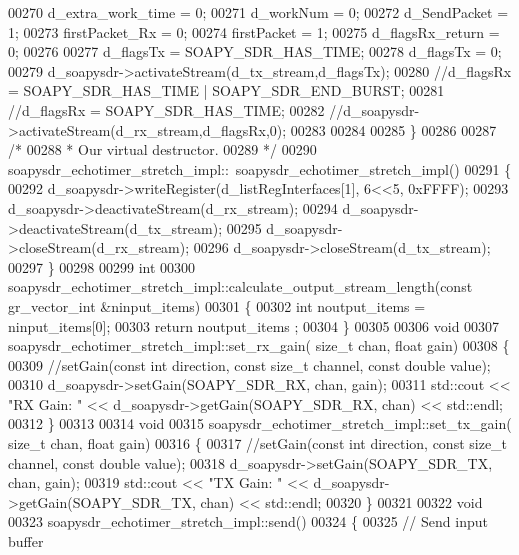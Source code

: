 \begin{DoxyCode}
00270       d_extra_work_time = 0;
00271       d_workNum = 0;
00272       d_SendPacket = 1;
00273       firstPacket_Rx = 0;
00274       firstPacket = 1;
00275       d_flagsRx_return = 0;
00276 
00277       d_flagsTx = SOAPY_SDR_HAS_TIME;
00278       d_flagsTx = 0;
00279       d_soapysdr->activateStream(d_tx_stream,d_flagsTx);
00280       \textcolor{comment}{//d\_flagsRx = SOAPY\_SDR\_HAS\_TIME | SOAPY\_SDR\_END\_BURST;}
00281       \textcolor{comment}{//d\_flagsRx = SOAPY\_SDR\_HAS\_TIME;}
00282       \textcolor{comment}{//d\_soapysdr->activateStream(d\_rx\_stream,d\_flagsRx,0);}
00283 
00284 
00285     \}
00286 
00287     \textcolor{comment}{/*}
00288 \textcolor{comment}{     * Our virtual destructor.}
00289 \textcolor{comment}{     */}
00290     soapysdr_echotimer_stretch_impl::~soapysdr_echotimer_stretch_impl()
00291     \{
00292       d_soapysdr->writeRegister(d_listRegInterfaces[1], 6<<5, 0xFFFF);
00293       d_soapysdr->deactivateStream(d_rx_stream);
00294       d_soapysdr->deactivateStream(d_tx_stream);
00295       d_soapysdr->closeStream(d_rx_stream);
00296       d_soapysdr->closeStream(d_tx_stream);
00297     \}
00298 
00299     \textcolor{keywordtype}{int}
00300     soapysdr_echotimer_stretch_impl::calculate_output_stream_length(\textcolor{keyword}{const} gr\_vector\_int &ninput\_items)
00301     \{
00302       \textcolor{keywordtype}{int} noutput\_items = ninput\_items[0];
00303       \textcolor{keywordflow}{return} noutput\_items ;
00304     \}
00305 
00306     \textcolor{keywordtype}{void}
00307     soapysdr_echotimer_stretch_impl::set_rx_gain( \textcolor{keywordtype}{size\_t} chan, \textcolor{keywordtype}{float} gain)
00308     \{
00309       \textcolor{comment}{//setGain(const int direction, const size\_t channel, const double value);}
00310       d_soapysdr->setGain(SOAPY_SDR_RX, chan, gain);
00311       std::cout << \textcolor{stringliteral}{"RX Gain: "}  << d_soapysdr->getGain(SOAPY_SDR_RX, chan) << std::endl;
00312     \}
00313 
00314     \textcolor{keywordtype}{void}
00315     soapysdr_echotimer_stretch_impl::set_tx_gain( \textcolor{keywordtype}{size\_t} chan, \textcolor{keywordtype}{float} gain)
00316     \{
00317       \textcolor{comment}{//setGain(const int direction, const size\_t channel, const double value);}
00318       d_soapysdr->setGain(SOAPY_SDR_TX, chan, gain);
00319       std::cout << \textcolor{stringliteral}{"TX Gain: "}  << d_soapysdr->getGain(SOAPY_SDR_TX, chan) << std::endl;
00320     \}
00321 
00322     \textcolor{keywordtype}{void}
00323     soapysdr_echotimer_stretch_impl::send()
00324     \{
00325       \textcolor{comment}{// Send input buffer}

\end{DoxyCode}
